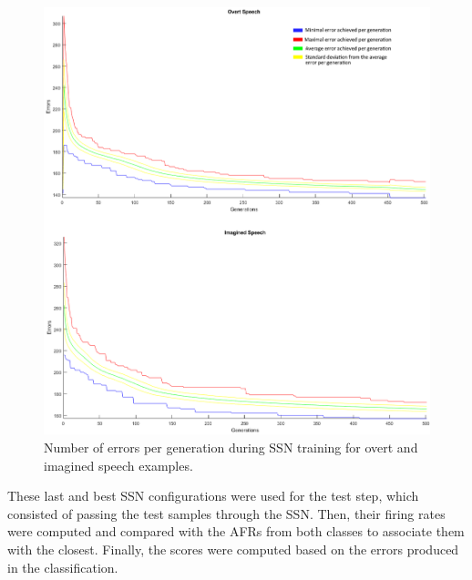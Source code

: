 \begin{figure}[h!]
	\centering
	\includegraphics[width=\linewidth]{Figures/SSN_Error.png}
	\caption{Number of errors per generation during SSN training for overt and imagined speech examples.}
	\label{Fig: SSN_Error}
\end{figure}

These last and best SSN configurations were used for the test step, which consisted of passing the test samples through the SSN. Then, their firing rates were computed and compared with the AFRs from both classes to associate them with the closest. Finally, the scores were computed based on the errors produced in the classification.\\